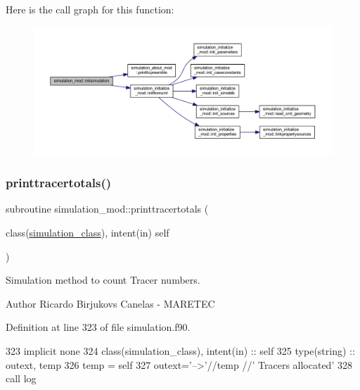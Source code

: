 Here is the call graph for this function\+:\nopagebreak
\begin{figure}[H]
\begin{center}
\leavevmode
\includegraphics[width=350pt]{namespacesimulation__mod_aedbba2bb458cbcd7eb93938a5f7b5940_cgraph}
\end{center}
\end{figure}
\mbox{\label{namespacesimulation__mod_aba126a8e0575cabb3bef6ab395002b3c}} 
\subsubsection{\texorpdfstring{printtracertotals()}{printtracertotals()}}
{\footnotesize\ttfamily subroutine simulation\+\_\+mod\+::printtracertotals (\begin{DoxyParamCaption}\item[{class(\mbox{\hyperlink{structsimulation__mod_1_1simulation__class}{simulation\+\_\+class}}), intent(in)}]{self }\end{DoxyParamCaption})\hspace{0.3cm}{\ttfamily [private]}}



Simulation method to count Tracer numbers. 

\begin{DoxyAuthor}{Author}
Ricardo Birjukovs Canelas -\/ M\+A\+R\+E\+T\+EC 
\end{DoxyAuthor}


Definition at line 323 of file simulation.\+f90.


\begin{DoxyCode}
323     \textcolor{keywordtype}{implicit none}
324     \textcolor{keywordtype}{class}(simulation\_class), \textcolor{keywordtype}{intent(in)} :: self
325     \textcolor{keywordtype}{type}(string) :: outext, temp
326     temp = self%
327     outext=\textcolor{stringliteral}{'-->'}//temp //\textcolor{stringliteral}{' Tracers allocated'}
328     \textcolor{keyword}{call }log%
\end{DoxyCode}
\mbox{\label{namespacesimulation__mod_a73bd78c4ac76c51f1e10f5847c25c4df}} 
